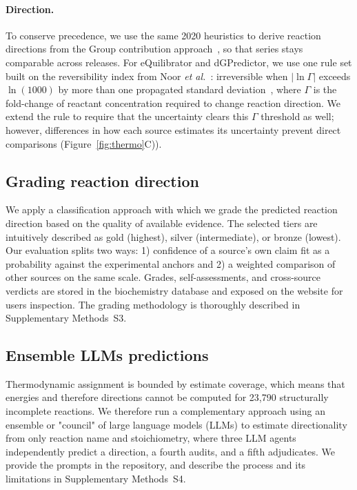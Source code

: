 \documentclass[unnumsec,webpdf,modern,large]{oup-authoring-template}
\begin{document}
\paragraph{Direction.} To conserve precedence, we use the same 2020 heuristics to derive reaction directions from the Group contribution approach~\cite{jankowski2008}, so that series stays comparable across releases.
For eQuilibrator and dGPredictor, we use one rule set built on the reversibility index from Noor \textit{et al.}~\cite{noor2012}: irreversible when $|\ln\Gamma|$ exceeds $\ln(1000)$ by more than one propagated standard deviation~\cite{beber2022}, where $\Gamma$ is the fold-change of reactant concentration required to change reaction direction.
We extend the rule to require that the uncertainty clears this $\Gamma$ threshold as well; however, differences in how each source estimates its uncertainty prevent direct comparisons (Figure~\ref{fig:thermo}C)).
\subsection{Grading reaction direction}\label{sec:methods-grading}

We apply a classification approach with which we grade the predicted reaction direction based on the quality of available evidence.
The selected tiers are intuitively described as gold (highest), silver (intermediate), or bronze (lowest).
Our evaluation splits two ways: 1) confidence of a source's own claim fit as a probability against the experimental anchors and 2) a weighted comparison of other sources on the same scale.
Grades, self-assessments, and cross-source verdicts are stored in the biochemistry database and exposed on the website for users inspection.
The grading methodology is thoroughly described in Supplementary Methods~S3.

\subsection{Ensemble LLMs predictions}\label{sec:llm-grading}
Thermodynamic assignment is bounded by estimate coverage, which means that energies and therefore directions cannot be computed for 23,790 structurally incomplete reactions.
We therefore run a complementary approach using an ensemble or "council" of large language models (LLMs) to estimate directionality from only reaction name and stoichiometry, where three LLM agents independently predict a direction, a fourth audits, and a fifth adjudicates.
We provide the prompts in the repository, and describe the process and its limitations in Supplementary Methods~S4.
\end{document}
